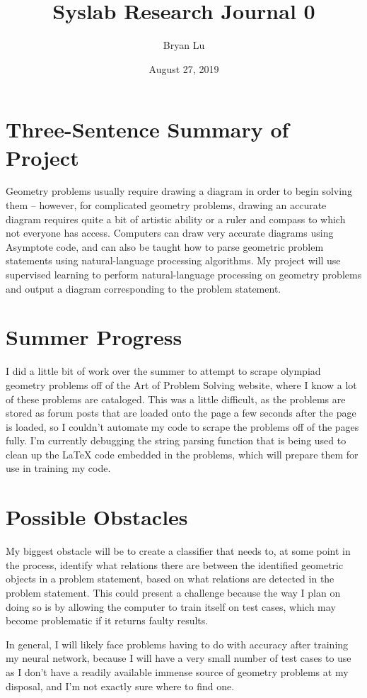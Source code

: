 \documentclass[12pt]{scrartcl}
\title{Syslab Research Journal 0}
\author{Bryan Lu}
\date{August 27, 2019}
\begin{document}
\maketitle

\section{Three-Sentence Summary of Project}
Geometry problems usually require drawing a diagram in order to begin solving them -- however, for complicated geometry problems, drawing an accurate diagram requires quite a bit of artistic ability or a ruler and compass to which not everyone has access. Computers can draw very accurate diagrams using Asymptote code, and can also be taught how to parse geometric problem statements using natural-language processing algorithms. My project will use supervised learning to perform natural-language processing on geometry problems and output a diagram corresponding to the problem statement. 

\section{Summer Progress}
I did a little bit of work over the summer to attempt to scrape olympiad geometry problems off of the Art of Problem Solving website, where I know a lot of these problems are cataloged. This was a little difficult, as the problems are stored as forum posts that are loaded onto the page a few seconds after the page is loaded, so I couldn't automate my code to scrape the problems off of the pages fully. I'm currently debugging the string parsing function that is being used to clean up the LaTeX code embedded in the problems, which will prepare them for use in training my code. 

\section{Possible Obstacles}
My biggest obstacle will be to create a classifier that needs to, at some point in the process, identify what relations there are between the identified geometric objects in a problem statement, based on what relations are detected in the problem statement. This could present a challenge because the way I plan on doing so is by allowing the computer to train itself on test cases, which may become problematic if it returns faulty results.  

In general, I will likely face problems having to do with accuracy after training my neural network, because I will have a very small number of test cases to use as I don't have a readily available immense source of geometry problems at my disposal, and I'm not exactly sure where to find one. 
\end{document}

